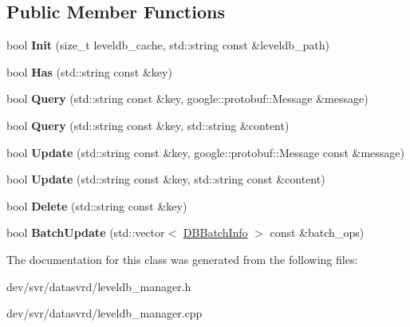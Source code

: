 \subsection*{Public Member Functions}
\begin{DoxyCompactItemize}
\item 
\hypertarget{classLevelDBManager_a9bb2eb976391a3a9dbef61c04d328a7c}{
bool {\bfseries Init} (size\_\-t leveldb\_\-cache, std::string const \&leveldb\_\-path)}
\label{classLevelDBManager_a9bb2eb976391a3a9dbef61c04d328a7c}

\item 
\hypertarget{classLevelDBManager_a59807591eb91c7438e39d63851ce1868}{
bool {\bfseries Has} (std::string const \&key)}
\label{classLevelDBManager_a59807591eb91c7438e39d63851ce1868}

\item 
\hypertarget{classLevelDBManager_aa28f74df620826d4692e91d8b04bb2ca}{
bool {\bfseries Query} (std::string const \&key, google::protobuf::Message \&message)}
\label{classLevelDBManager_aa28f74df620826d4692e91d8b04bb2ca}

\item 
\hypertarget{classLevelDBManager_a31004736e82748b2bff292b150dbfa1a}{
bool {\bfseries Query} (std::string const \&key, std::string \&content)}
\label{classLevelDBManager_a31004736e82748b2bff292b150dbfa1a}

\item 
\hypertarget{classLevelDBManager_a9522ef00c5e43ca71f4b24f9abfdca24}{
bool {\bfseries Update} (std::string const \&key, google::protobuf::Message const \&message)}
\label{classLevelDBManager_a9522ef00c5e43ca71f4b24f9abfdca24}

\item 
\hypertarget{classLevelDBManager_aa7fdee6fea29ffc7810254c2251d845e}{
bool {\bfseries Update} (std::string const \&key, std::string const \&content)}
\label{classLevelDBManager_aa7fdee6fea29ffc7810254c2251d845e}

\item 
\hypertarget{classLevelDBManager_a865672541d3f4a9a9a9ad350ea19d390}{
bool {\bfseries Delete} (std::string const \&key)}
\label{classLevelDBManager_a865672541d3f4a9a9a9ad350ea19d390}

\item 
\hypertarget{classLevelDBManager_a50ad4e7d39bd513d9d0e51230e8d5f2b}{
bool {\bfseries BatchUpdate} (std::vector$<$ \hyperlink{structDBBatchInfo}{DBBatchInfo} $>$ const \&batch\_\-ops)}
\label{classLevelDBManager_a50ad4e7d39bd513d9d0e51230e8d5f2b}

\end{DoxyCompactItemize}


The documentation for this class was generated from the following files:\begin{DoxyCompactItemize}
\item 
dev/svr/datasvrd/leveldb\_\-manager.h\item 
dev/svr/datasvrd/leveldb\_\-manager.cpp\end{DoxyCompactItemize}
